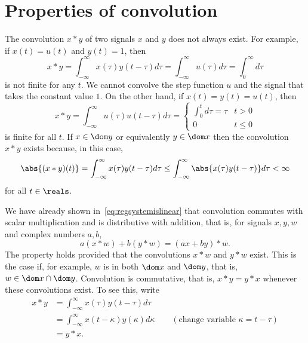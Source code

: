 \section{Properties of convolution}\label{sec:prop-conv}

The convolution $x * y$ of two signals $x$ and $y$ does not always exist.  For example, if $x(t) = u(t)$ and $y(t) = 1$, then
\[
x * y = \int_{-\infty}^\infty x(\tau) y(t - \tau) d\tau = \int_{-\infty}^\infty u(\tau) d\tau = \int_{0}^\infty d\tau
\]
is not finite for any $t$.  We cannot convolve the step function $u$ and the signal that takes the constant value $1$.  On the other hand, if $x(t) = y(t) = u(t)$, then
\[
x * y = \int_{-\infty}^\infty u(\tau) u(t - \tau) d\tau =  \begin{cases}
\int_{0}^t d\tau  = \tau & t > 0 \\
0 & t \leq 0
\end{cases}
\]
is finite for all $t$.  If $x \in \dom y$ or equivalently $y \in \dom x$ then the convolution $x * y$ exists because, in this case,
\[
\abs{(x*y)(t)} = \int_{-\infty}^{\infty} x(\tau) y(t - \tau) d\tau \leq \int_{-\infty}^{\infty} \abs{x(\tau) y(t - \tau)} d\tau < \infty 
\]
for all $t \in \reals$.  

We have already shown in~\eqref{eq:regsystemislinear} that convolution commutes with scalar multiplication and is distributive with addition, that is, for signals $x,y,w$ and complex numbers $a,b$,
\[
a (x * w) + b (y * w) = (ax + by) * w.
\]
The property holds provided that the convolutions $x*w$ and $y*w$ exist.  This is the case if, for example, $w$ is in both  $\dom x$ and $\dom y$, that is, $w \in \dom x \cap \dom y$.  Convolution is commutative, that is, $x*y = y*x$ whenever these convolutions exist.  To see this, write
\begin{align*}
x*y &= \int_{-\infty}^\infty x(\tau) y(t - \tau) d\tau \\
&= \int_{-\infty}^\infty x(t - \kappa) y(\kappa) d\kappa \qquad (\text{change variable $\kappa = t - \tau$}) \\
&= y * x.
\end{align*}

